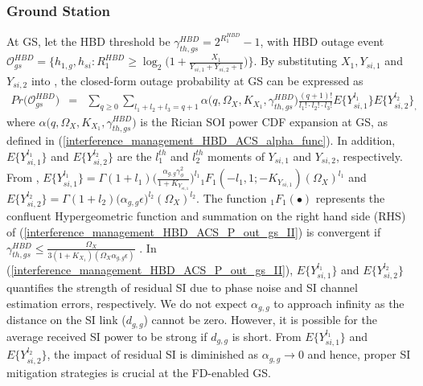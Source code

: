 \subsubsection{Ground Station}
At GS, let the HBD threshold be $\gamma_{th,gs}^{HBD} = 2^{R_{1}^{HBD}}-1$, with HBD outage event $\mathcal{O}_{gs}^{HBD} = \Big\{ h_{1,g}, h_{si} : R_{1}^{HBD} \geq \log_{2}\Big(1 + \frac{X_{1}}{Y_{si,1} + Y_{si,2} + 1}\Big)\Big\}$. By substituting $X_{1}, Y_{si,1}$ and $Y_{si,2}$ into \cite[Eq. (12)]{rached2017unified}, the closed-form outage probability at GS can be expressed as
\begin{eqnarray} \label{interference_management_HBD_ACS_P_out_gs_II}
Pr\big(\mathcal{O}_{gs}^{HBD}\big) & = & \sum_{q\geq0}\sum_{l_1+l_2+l_3=q+1} \alpha\big(q,\Omega_X,K_{X_1},\gamma_{th,gs}^{HBD}\big) \frac{(q+1)!}{l_1! \cdot l_2! \cdot l_3!} E\{Y_{si,1}^{l_1}\} E\{Y_{si,2}^{l_2}\}_,
\end{eqnarray}
where $\alpha\big(q,\Omega_X,K_{X_1},\gamma_{th,gs}^{HBD}\big)$ is the Rician SOI power CDF expansion at GS, as defined in (\ref{interference_management_HBD_ACS_alpha_func}). In addition, $E\{Y_{si,1}^{l_1}\}$ and $E\{Y_{si,2}^{l_2}\}$ are the $l_1^{th}$ and $l_2^{th}$ moments of $Y_{si,1}$ and $Y_{si,2}$, respectively. From \cite[Table II]{rached2017unified}, $E\{Y_{si,1}^{l_1}\} = \Gamma(1+l_1) \Big(\frac{\alpha_{g,g}\gamma_{\phi}^2}{1+K_{Y_{si,1}}}\Big)^{l_1}{}_1{F_1}(-l_1,1;-K_{Y_{si,1}})(\Omega_X)^{l_1}$ and $E\{Y_{si,2}^{l_2}\} = \Gamma(1+l_2) (\alpha_{g,g}\epsilon\big)^{l_2} (\Omega_X)^{l_2}$. The function ${}_1{F_1}(\bullet)$ represents the confluent Hypergeometric function \cite[Eq. (9.210.1)]{gradshteyn2014table} and summation on the right hand side (RHS) of (\ref{interference_management_HBD_ACS_P_out_gs_II}) is convergent if $\gamma_{th,gs}^{HBD} \leq \frac{\Omega_X}{3(1+K_{X_{1}})(\Omega_X\alpha_{g,g}\epsilon)}$ \cite[Eq. (14)]{rached2017unified}. In (\ref{interference_management_HBD_ACS_P_out_gs_II}), $E\{Y_{si,1}^{l_1}\}$ and $E\{Y_{si,2}^{l_2}\}$ quantifies the strength of residual SI due to phase noise and SI channel estimation errors, respectively. We do not expect $\alpha_{g,g}$ to approach infinity as the distance on the SI link ($d_{g,g}$) cannot be zero. However, it is possible for the average received SI power to be strong if $d_{g,g}$ is short. From $E\{Y_{si,1}^{l_1}\}$ and $E\{Y_{si,2}^{l_2}\}$, the impact of residual SI is diminished as $\alpha_{g,g} \to 0$ and hence, proper SI mitigation strategies is crucial at the FD-enabled GS. 

